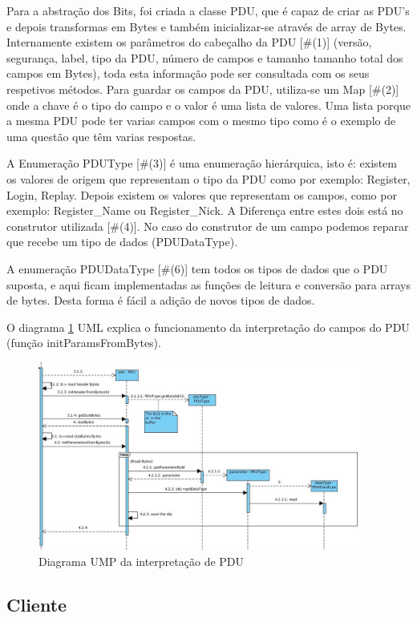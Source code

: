 \documentclass[runningheads,a4paper]{llncs}
\begin{document}
Para a abstração dos Bits, foi criada a classe PDU, que é capaz de criar as PDU’s e depois transformas em Bytes e também inicializar-se através de array de Bytes.
Internamente existem os parâmetros do cabeçalho da PDU [\#(1)] (versão, segurança, label, tipo da PDU, número de campos e tamanho tamanho total dos campos em Bytes), toda esta informação pode ser consultada com os seus respetivos métodos.
Para guardar os campos da PDU, utiliza-se um Map [\#(2)] onde a chave é o tipo do campo e o valor é uma lista de valores. Uma lista porque a mesma PDU pode ter varias campos com o mesmo tipo como é o exemplo de uma questão que têm varias respostas.

A Enumeração PDUType [\#(3)] é uma enumeração hierárquica, isto é: existem os valores de origem que representam o tipo da PDU como por exemplo: Register, Login, Replay. Depois existem os valores que representam os campos, como por exemplo: Register\_Name ou Register\_Nick.
A Diferença entre estes dois está no construtor utilizada [\#(4)]. No caso do construtor de um campo podemos reparar que recebe um tipo de dados (PDUDataType).

A enumeração PDUDataType [\#(6)] tem todos os tipos de dados que o PDU suposta, e aqui ficam implementadas as funções de leitura e conversão para arrays de bytes.
Desta forma é fácil a adição de novos tipos de dados.

O diagrama \ref{fig:diagram-pdu} UML explica o funcionamento da interpretação do campos do PDU (função initParamsFromBytes).

\begin{figure}
\centering
\includegraphics[height=6.2cm]{PDU_interpretation.jpg}
\caption{Diagrama UMP da interpretação de PDU}
\label{fig:diagram-pdu}
\end{figure}

\subsection{Cliente}
\end{document}
